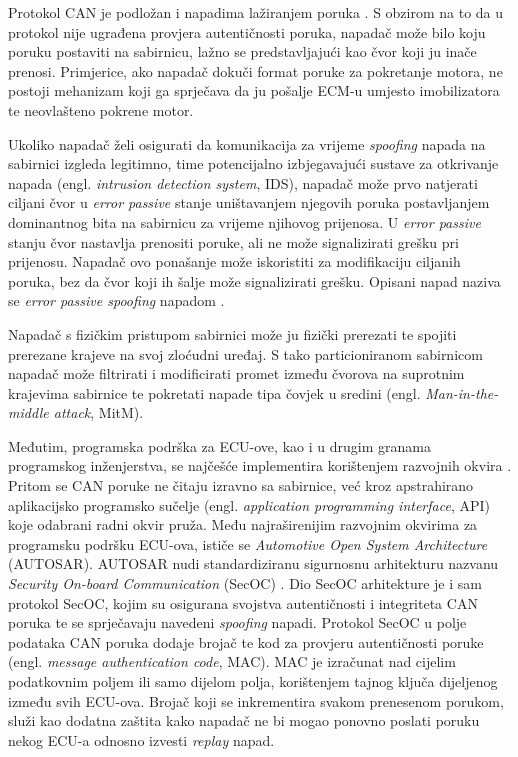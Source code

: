 \documentclass[times, utf8, diplomski, numeric]{fer}
\begin{document}
Protokol CAN je podložan i napadima lažiranjem poruka . S obzirom na to da u protokol nije ugrađena provjera autentičnosti poruka, napadač može bilo koju poruku postaviti na sabirnicu, lažno se predstavljajući kao čvor koji ju inače prenosi. Primjerice, ako napadač dokuči format poruke za pokretanje motora, ne postoji mehanizam koji ga sprječava da ju pošalje ECM-u umjesto imobilizatora te neovlašteno pokrene motor. 

Ukoliko napadač želi osigurati da komunikacija za vrijeme \textit{spoofing} napada na sabirnici izgleda legitimno, time potencijalno izbjegavajući sustave za otkrivanje napada (engl. \textit{intrusion detection system}, IDS), napadač može prvo natjerati ciljani čvor u \textit{error passive} stanje uništavanjem njegovih poruka postavljanjem dominantnog bita na sabirnicu za vrijeme njihovog prijenosa. U \textit{error passive} stanju čvor nastavlja prenositi poruke, ali ne može signalizirati grešku pri prijenosu. Napadač ovo ponašanje može iskoristiti za modifikaciju ciljanih poruka, bez da čvor koji ih šalje može signalizirati grešku. Opisani napad naziva se \textit{error passive spoofing} napadom \cite{tindell2022can}. 

Napadač s fizičkim pristupom sabirnici može ju fizički prerezati te spojiti prerezane krajeve na svoj zloćudni uređaj. S tako particioniranom sabirnicom napadač može filtrirati i modificirati promet između čvorova na suprotnim krajevima sabirnice te pokretati napade tipa čovjek u sredini (engl. \textit{Man-in-the-middle attack}, MitM). 

Međutim, programska podrška za ECU-ove, kao i u drugim granama programskog inženjerstva, se najčešće implementira korištenjem razvojnih okvira . Pritom se CAN poruke ne čitaju izravno sa sabirnice, već kroz apstrahirano aplikacijsko programsko sučelje (engl. \textit{application programming interface}, API) koje odabrani radni okvir pruža. Među najraširenijim razvojnim okvirima za programsku podršku ECU-ova, ističe se \textit{Automotive Open System Architecture} (AUTOSAR). AUTOSAR nudi standardiziranu sigurnosnu arhitekturu nazvanu \textit{Security On-board Communication} (SecOC) \cite{autosar2020secoc}. Dio SecOC arhitekture je i sam protokol SecOC, kojim su osigurana svojstva autentičnosti i integriteta CAN poruka te se sprječavaju navedeni \textit{spoofing} napadi. Protokol SecOC u polje podataka CAN poruka dodaje brojač te kod za provjeru autentičnosti poruke (engl. \textit{message authentication code}, MAC). MAC je izračunat nad cijelim podatkovnim poljem ili samo dijelom polja, korištenjem tajnog ključa dijeljenog između svih ECU-ova. Brojač koji se inkrementira svakom prenesenom porukom, služi kao dodatna zaštita kako napadač ne bi mogao ponovno poslati poruku nekog ECU-a odnosno izvesti \textit{replay} napad.   
\end{document}
